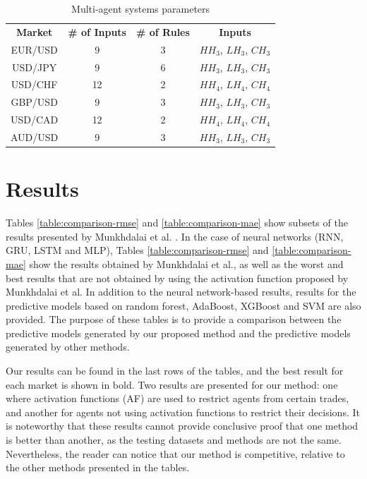 ﻿\documentclass{ieeeaccess}
\begin{document}

\begin{table}[]
  \caption{Multi-agent systems parameters}
  \small
  \centering
  \begin{tabular}{cccc}
    \textbf{Market} & \textbf{\# of Inputs} & \textbf{\# of Rules} & \textbf{Inputs} \\
    EUR/USD & 9 & 3 & $HH_3$, $LH_3$, $CH_3$ \\
    USD/JPY & 9 & 6 & $HH_3$, $LH_3$, $CH_3$ \\
    USD/CHF & 12 & 2 & $HH_4$, $LH_4$, $CH_4$ \\
    GBP/USD & 9 & 3 & $HH_3$, $LH_3$, $CH_3$ \\
    USD/CAD & 12 & 2 & $HH_4$, $LH_4$, $CH_4$ \\
    AUD/USD & 9 & 3 & $HH_3$, $LH_3$, $CH_3$ \\
  \end{tabular}
  \label{agents-parameters}
\end{table}

\section{Results}
\label{section:results}

Tables \ref{table:comparison-rmse} and \ref{table:comparison-mae} show
subsets of the results presented by Munkhdalai et
al. \cite{Munkhdalai2019}. In the case of neural networks (RNN, GRU,
LSTM and MLP), Tables \ref{table:comparison-rmse} and
\ref{table:comparison-mae} show the results obtained by Munkhdalai et
al., as well as the worst and best results that are not obtained by
using the activation function proposed by Munkhdalai et al. In
addition to the neural network-based results, results for the
predictive models based on random forest, AdaBoost, XGBoost and
SVM are also provided. The purpose of these tables
is to provide a comparison between the predictive models generated by
our proposed method and the predictive models generated by other
methods.

Our results can be found in the last rows of the tables, and the best
result for each market is shown in bold. %
Two results are presented for
our method: one where activation functions (AF) are used to restrict agents
from certain trades, and another for agents not using activation
functions to restrict their decisions. It is noteworthy that these
results cannot provide conclusive proof that one method is better than
another, as the testing datasets and methods are not the
same. Nevertheless, the reader can notice that our method is
competitive, relative to the other methods presented in the tables. %
\end{document}
